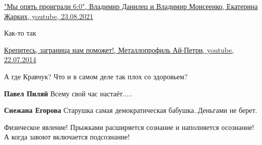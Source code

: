 \begin{itemize}
\href{https://www.youtube.com/watch?v=gdmZAZSbGE8}{%
"Мы опять проиграли 6:0", Владимир Данилец и Владимир Моисеенко, %
Екатерина Жарких, youtube, 23.08.2021%
}

 
Как-то так 

\href{https://www.youtube.com/watch?v=S3d1CgvZ3_k}{%
Крепитесь, заграница нам поможет!, Металлопрофиль Ай-Петри, youtube, 22.07.2014%
}

 
А где Кравчук? Что и в самом деле так плох со здоровьем?

\begin{itemize}
 
\textbf{Павел Пиляй} Всему свой час настаёт.....

 
\textbf{Снежана Егорова} Старушка самая демократическая бабушка..Деньгами не берет.
\end{itemize}

 
Физическое явление! Прыжками расширяется сознание и наполняется осознание! А когда завоют включается подсознание!

 

\end{itemize}
